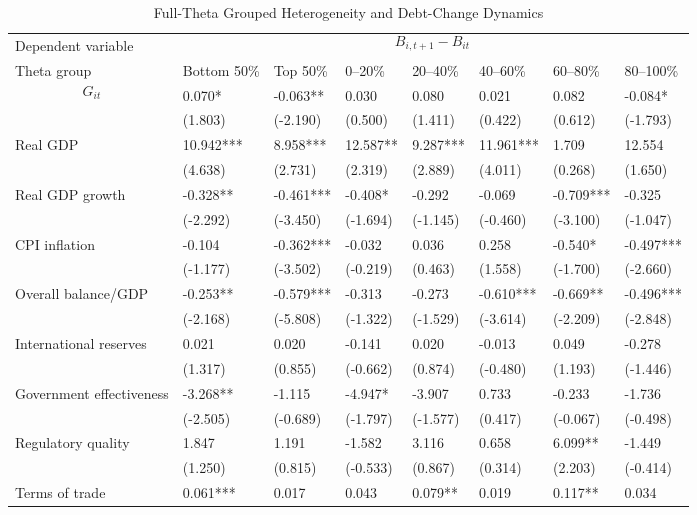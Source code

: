 \begin{table}[H]\centering
\begin{threeparttable}
\caption{Full-Theta Grouped Heterogeneity and Debt-Change Dynamics}
\label{tab:theta_group_heterogeneity_debt}
\scriptsize
\begin{tabularx}{\textwidth}{lYYYYYYY}
\toprule
Dependent variable &  \\
\cmidrule(lr){2-8}
Theta group & Bottom 50\% & Top 50\% & 0--20\% & 20--40\% & 40--60\% & 60--80\% & 80--100\% \\
\midrule
$$G_{it}$$ & 0.070* & -0.063** & 0.030 & 0.080 & 0.021 & 0.082 & -0.084* \\
  & (1.803) & (-2.190) & (0.500) & (1.411) & (0.422) & (0.612) & (-1.793) \\
Real GDP & 10.942*** & 8.958*** & 12.587** & 9.287*** & 11.961*** & 1.709 & 12.554 \\
  & (4.638) & (2.731) & (2.319) & (2.889) & (4.011) & (0.268) & (1.650) \\
Real GDP growth & -0.328** & -0.461*** & -0.408* & -0.292 & -0.069 & -0.709*** & -0.325 \\
  & (-2.292) & (-3.450) & (-1.694) & (-1.145) & (-0.460) & (-3.100) & (-1.047) \\
CPI inflation & -0.104 & -0.362*** & -0.032 & 0.036 & 0.258 & -0.540* & -0.497*** \\
  & (-1.177) & (-3.502) & (-0.219) & (0.463) & (1.558) & (-1.700) & (-2.660) \\
Overall balance/GDP & -0.253** & -0.579*** & -0.313 & -0.273 & -0.610*** & -0.669** & -0.496*** \\
  & (-2.168) & (-5.808) & (-1.322) & (-1.529) & (-3.614) & (-2.209) & (-2.848) \\
International reserves & 0.021 & 0.020 & -0.141 & 0.020 & -0.013 & 0.049 & -0.278 \\
  & (1.317) & (0.855) & (-0.662) & (0.874) & (-0.480) & (1.193) & (-1.446) \\
Government effectiveness & -3.268** & -1.115 & -4.947* & -3.907 & 0.733 & -0.233 & -1.736 \\
  & (-2.505) & (-0.689) & (-1.797) & (-1.577) & (0.417) & (-0.067) & (-0.498) \\
Regulatory quality & 1.847 & 1.191 & -1.582 & 3.116 & 0.658 & 6.099** & -1.449 \\
  & (1.250) & (0.815) & (-0.533) & (0.867) & (0.314) & (2.203) & (-0.414) \\
Terms of trade & 0.061*** & 0.017 & 0.043 & 0.079** & 0.019 & 0.117** & 0.034 \\

\end{tabularx}
\end{threeparttable}
\end{table}
